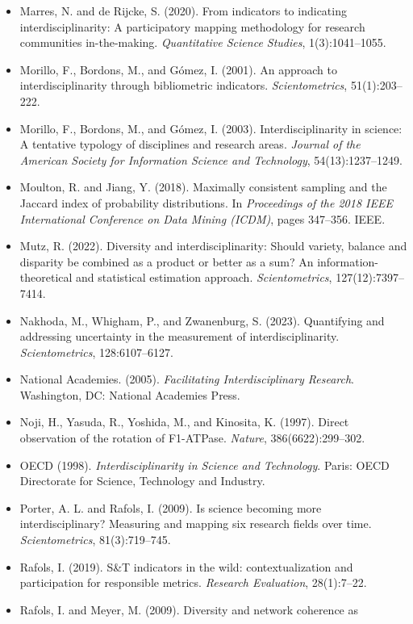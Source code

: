 \documentclass[
]{article}
\begin{document}
\begin{itemize}
\item
  Marres, N. and de Rijcke, S. (2020). From indicators to indicating
  interdisciplinarity: A participatory mapping methodology for research
  communities in-the-making. \emph{Quantitative Science Studies},
  1(3):1041--1055.
\item
  Morillo, F., Bordons, M., and Gómez, I. (2001). An approach to
  interdisciplinarity through bibliometric indicators.
  \emph{Scientometrics}, 51(1):203--222.
\item
  Morillo, F., Bordons, M., and Gómez, I. (2003). Interdisciplinarity in
  science: A tentative typology of disciplines and research areas.
  \emph{Journal of the American Society for Information Science and
  Technology}, 54(13):1237--1249.
\item
  Moulton, R. and Jiang, Y. (2018). Maximally consistent sampling and
  the Jaccard index of probability distributions. In \emph{Proceedings
  of the 2018 IEEE International Conference on Data Mining (ICDM)},
  pages 347--356. IEEE.
\item
  Mutz, R. (2022). Diversity and interdisciplinarity: Should variety,
  balance and disparity be combined as a product or better as a sum? An
  information-theoretical and statistical estimation approach.
  \emph{Scientometrics}, 127(12):7397--7414.
\item
  Nakhoda, M., Whigham, P., and Zwanenburg, S. (2023). Quantifying and
  addressing uncertainty in the measurement of interdisciplinarity.
  \emph{Scientometrics}, 128:6107--6127.
\item
  National Academies. (2005). \emph{Facilitating Interdisciplinary
  Research}. Washington, DC: National Academies Press.
\item
  Noji, H., Yasuda, R., Yoshida, M., and Kinosita, K. (1997). Direct
  observation of the rotation of F1-ATPase. \emph{Nature},
  386(6622):299--302.
\item
  OECD (1998). \emph{Interdisciplinarity in Science and Technology}.
  Paris: OECD Directorate for Science, Technology and Industry.
\item
  Porter, A. L. and Rafols, I. (2009). Is science becoming more
  interdisciplinary? Measuring and mapping six research fields over
  time. \emph{Scientometrics}, 81(3):719--745.
\item
  Rafols, I. (2019). S\&T indicators in the wild: contextualization and
  participation for responsible metrics. \emph{Research Evaluation},
  28(1):7--22.
\item
  Rafols, I. and Meyer, M. (2009). Diversity and network coherence as

\end{itemize}
\end{document}
